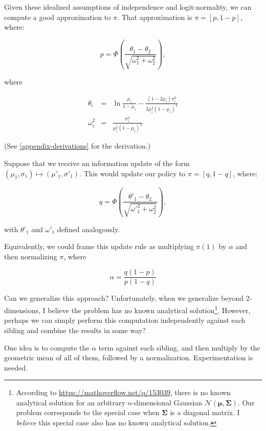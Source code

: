 \documentclass[tikz]{article}
\begin{document}
Given these idealized assumptions of independence and logit-normality, we can compute a good approximation to $\pi$. That
approximation is $\pi = [p, 1-p]$, where:

$$
p = \Phi\left(\frac{\theta_1 - \theta_2}{\sqrt{\omega_1^2 + \omega_2^2}}\right),
$$

where

\begin{eqnarray*}
\theta_i &=& \ln{\frac{\mu_i}{1-\mu_i}} - \frac{(1 - 2\mu_i)\sigma_i^2}{2\mu_i^2(1-\mu_i)^2} \\
\omega_i^2 &=& \frac{\sigma_i^2}{\mu_i^2(1-\mu_i)^2}
\end{eqnarray*}

(See \ref{appendix-derivations} for the derivation.) \newline

Suppose that we receive an information update of the form $(\mu_1, \sigma_1) \mapsto (\mu'_1, \sigma'_1)$.
This would update our policy to $\pi = [q, 1-q]$, where:

$$
q = \Phi\left(\frac{\theta'_1 - \theta_2}{\sqrt{\omega'_1^2 + \omega_2^2}}\right),
$$

with $\theta'_1$ and $\omega'_1$ defined analogously. \newline

Equivalently, we could frame this update rule as multiplying $\pi(1)$ by $\alpha$ and then normalizing $\pi$, where

$$
\alpha = \frac{q(1-p)}{p(1-q)}
$$

Can we generalize this approach? Unfortunately, when we generalize beyond 2-dimensions, I believe the problem has no known
analytical solution\footnote{According to \url{https://mathoverflow.net/q/153039}, there is no known analytical solution for an arbitrary $n$-dimensional
Gaussian $\mathcal{N}(\boldsymbol{\mu},\boldsymbol{\Sigma})$. Our problem corresponds to the special case when $\boldsymbol{\Sigma}$ is a diagonal matrix. I \emph{believe}
this special case also has no known analytical solution.}. However, perhaps we can simply perform this computation
independently against each sibling and combine the results in some way? \newline

One idea is to compute the $\alpha$ term against each sibling, and then multiply by the geometric mean of all of them, followed by a normalization.
Experimentation is needed. \newline
\end{document}
